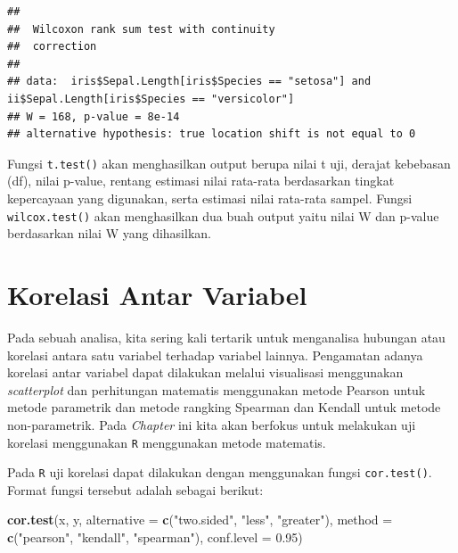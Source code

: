 \documentclass[
]{book}
\newenvironment{Shaded}{\begin{snugshade}}{\end{snugshade}}
\newcommand{\AttributeTok}[1]{\textcolor[rgb]{0.13,0.29,0.53}{#1}}
\newcommand{\FloatTok}[1]{\textcolor[rgb]{0.00,0.00,0.81}{#1}}
\newcommand{\FunctionTok}[1]{\textcolor[rgb]{0.13,0.29,0.53}{\textbf{#1}}}
\newcommand{\NormalTok}[1]{#1}
\newcommand{\StringTok}[1]{\textcolor[rgb]{0.31,0.60,0.02}{#1}}
\theoremstyle{definition}
\theoremstyle{definition}
\theoremstyle{definition}
\theoremstyle{definition}
\theoremstyle{remark}
\begin{document}
\begin{verbatim}
## 
##  Wilcoxon rank sum test with continuity
##  correction
## 
## data:  iris$Sepal.Length[iris$Species == "setosa"] and ii$Sepal.Length[iris$Species == "versicolor"]
## W = 168, p-value = 8e-14
## alternative hypothesis: true location shift is not equal to 0
\end{verbatim}

Fungsi \texttt{t.test()} akan menghasilkan output berupa nilai t uji, derajat kebebasan (df), nilai p-value, rentang estimasi nilai rata-rata berdasarkan tingkat kepercayaan yang digunakan, serta estimasi nilai rata-rata sampel. Fungsi \texttt{wilcox.test()} akan menghasilkan dua buah output yaitu nilai W dan p-value berdasarkan nilai W yang dihasilkan.

\hypertarget{korelasi-antar-variabel}{%
\section{Korelasi Antar Variabel}\label{korelasi-antar-variabel}}

Pada sebuah analisa, kita sering kali tertarik untuk menganalisa hubungan atau korelasi antara satu variabel terhadap variabel lainnya. Pengamatan adanya korelasi antar variabel dapat dilakukan melalui visualisasi menggunakan \emph{scatterplot} dan perhitungan matematis menggunakan metode Pearson untuk metode parametrik dan metode rangking Spearman dan Kendall untuk metode non-parametrik. Pada \emph{Chapter} ini kita akan berfokus untuk melakukan uji korelasi menggunakan \texttt{R} menggunakan metode matematis.

Pada \texttt{R} uji korelasi dapat dilakukan dengan menggunakan fungsi \texttt{cor.test()}. Format fungsi tersebut adalah sebagai berikut:

\begin{Shaded}
\begin{Highlighting}[]
\FunctionTok{cor.test}\NormalTok{(x, y,}
         \AttributeTok{alternative =} \FunctionTok{c}\NormalTok{(}\StringTok{"two.sided"}\NormalTok{, }\StringTok{"less"}\NormalTok{, }\StringTok{"greater"}\NormalTok{),}
         \AttributeTok{method =} \FunctionTok{c}\NormalTok{(}\StringTok{"pearson"}\NormalTok{, }\StringTok{"kendall"}\NormalTok{, }\StringTok{"spearman"}\NormalTok{),}
         \AttributeTok{conf.level =} \FloatTok{0.95}\NormalTok{)}
\end{Highlighting}
\end{Shaded}
\end{document}
